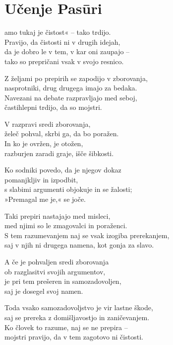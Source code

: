 \cleartorecto
{}
\chapter{Učenje Pasūri}

amo tukaj je čistost« -- tako trdijo.\\
Pravijo, da čistosti ni v drugih idejah,\\
da je dobro le v tem, v kar oni zaupajo --\\
tako so prepričani vsak v svojo resnico.

Z željami po prepirih se zapodijo v zborovanja,\\
nasprotniki, drug drugega imajo za bedaka.\\
Navezani na debate razpravljajo med seboj,\\
častihlepni trdijo, da so mojstri.

V razpravi sredi zborovanja,\\
želeč pohval, skrbi ga, da bo poražen.\\
In ko je ovržen, je otožen,\\
razburjen zaradi graje, išče šibkosti.

Ko sodniki povedo, da je njegov dokaz\\
pomanjkljiv in izpodbit,\\
s slabimi argumenti objokuje in se žalosti;\\
»Premagal me je,« se joče.

\clearpage

Taki prepiri nastajajo med misleci,\\
med njimi so le zmagovalci in poraženci.\\
S tem razumevanjem naj se vsak izogiba prerekanjem,\\
saj v njih ni drugega namena, kot gonja za slavo.

A če je pohvaljen sredi zborovanja\\
ob razglasitvi svojih argumentov,\\
je pri tem prešeren in samozadovoljen,\\
saj je dosegel svoj namen.

Toda vsako samozadovoljstvo je vir lastne škode,\\
saj se prereka z domišljavostjo in zaničevanjem.\\
Ko človek to razume, naj se ne prepira --\\
mojstri pravijo, da v tem zagotovo ni čistosti.

